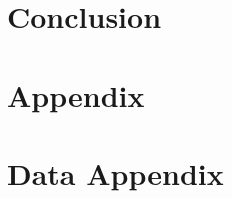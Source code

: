 \documentclass[sigconf]{acmart}
\begin{document}
% 


\section{Conclusion}
\label{sec:conclusion}
\vspace{-1mm}


\newpage





\clearpage

% 

\clearpage

\section{Appendix}
\label{sec:otherappendix}


\clearpage


\section{Data Appendix}
\label{sec:dataappendix}


\clearpage

% 

\newpage
\end{document}
